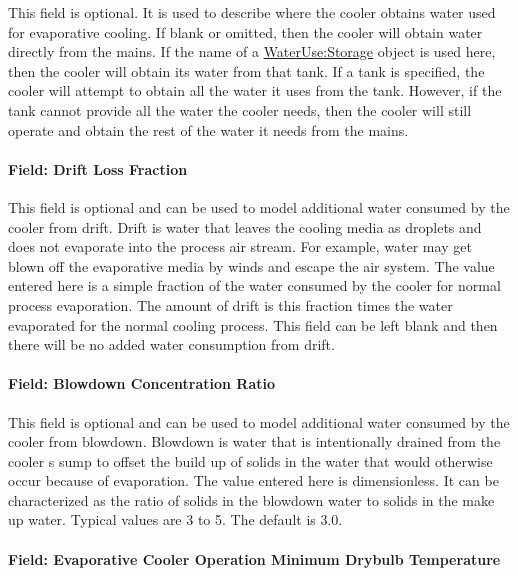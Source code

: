 This field is optional. It is used to describe where the cooler obtains water used for evaporative cooling. If blank or omitted, then the cooler will obtain water directly from the mains. If the name of a \hyperref[waterusestorage]{WaterUse:Storage} object is used here, then the cooler will obtain its water from that tank. If a tank is specified, the cooler will attempt to obtain all the water it uses from the tank. However, if the tank cannot provide all the water the cooler needs, then the cooler will still operate and obtain the rest of the water it needs from the mains.

\paragraph{Field: Drift Loss Fraction}\label{field-drift-loss-fraction}

This field is optional and can be used to model additional water consumed by the cooler from drift. Drift is water that leaves the cooling media as droplets and does not evaporate into the process air stream. For example, water may get blown off the evaporative media by winds and escape the air system. The value entered here is a simple fraction of the water consumed by the cooler for normal process evaporation. The amount of drift is this fraction times the water evaporated for the normal cooling process. This field can be left blank and then there will be no added water consumption from drift.

\paragraph{Field: Blowdown Concentration Ratio}\label{field-blowdown-concentration-ratio-000}

This field is optional and can be used to model additional water consumed by the cooler from blowdown. Blowdown is water that is intentionally drained from the cooler s sump to offset the build up of solids in the water that would otherwise occur because of evaporation. The value entered here is dimensionless. It can be characterized as the ratio of solids in the blowdown water to solids in the make up water. Typical values are 3 to 5. The default is 3.0.

\paragraph{Field: Evaporative Cooler Operation Minimum Drybulb Temperature}\label{field-evaporative-cooler-operation-minimum-drybulb-temperature}

